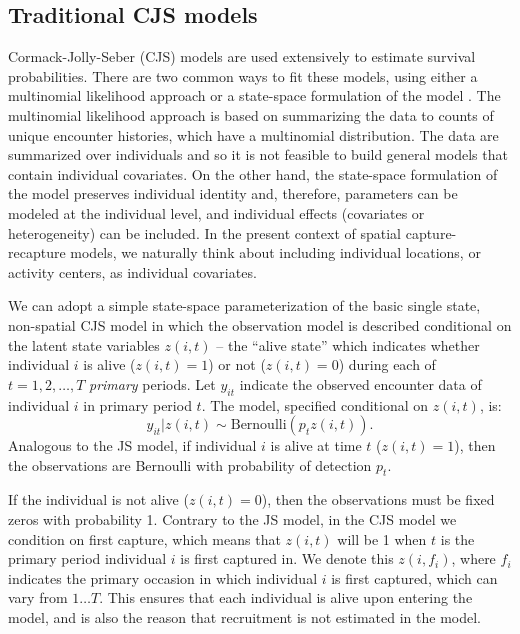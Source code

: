 \subsection{Traditional CJS models}
Cormack-Jolly-Seber (CJS) models are used extensively to estimate
survival probabilities.  There are two common ways to fit these
models, using either a multinomial likelihood approach
\citep{lebreton_etal:1992} or a state-space formulation of the model
\citep{gimenez:2007, royle:2008}.
The multinomial likelihood approach is based on summarizing the data
to counts of unique encounter histories, which have a multinomial
distribution. The data are summarized over individuals and so it is
not feasible to build general models that contain individual
covariates. On the other hand, the state-space formulation of the
model preserves individual identity and, therefore, parameters can be 
modeled at the individual level, and individual effects (covariates or
heterogeneity) can be included. In the present context of spatial
capture-recapture models, we naturally think about including
individual locations, or activity centers, as individual covariates. 


We can adopt a simple state-space parameterization of the
basic single state, non-spatial CJS model in which the observation model is
described conditional on the latent state variables $z(i,t)$ -- the
``alive state'' which indicates whether individual $i$ is
alive ($z(i,t)=1$) or not ($z(i,t)=0$) during each of $t=1,2,\ldots,T$
{\it primary} periods.
Let $y_{it}$ indicate the observed
encounter data of individual $i$ in primary period $t$. The
model, specified conditional on $z(i,t)$, is:
\[
  y_{it}|z(i,t) \sim \mbox{Bernoulli}(p_{t}z(i,t)).
\]
Analogous to the JS model, if individual $i$ is alive at time $t$
($z(i,t)=1$), then the observations are Bernoulli with probability of
detection $p_t$.  

If the individual is not alive ($z(i,t)=0$), then the observations
must be fixed zeros with probability 1.  Contrary to the JS model, in
the CJS model we condition on first capture, which means that
$z(i,t)$ will be 1 when $t$ is the primary period individual $i$ is
first captured in.  We denote this $z(i, f_i)$, where $f_i$ indicates
the primary occasion in which individual $i$ is first captured, which
can vary from $1 \dots T$.  This ensures that each individual is alive
upon entering the model, and is also the reason that recruitment is
not estimated in the model.

